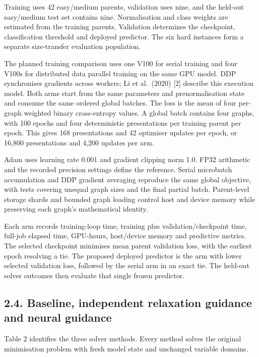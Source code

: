 \documentclass[
  british,
  10pt,
]{article}
\begin{document}
Training uses 42 easy/medium parents, validation uses nine, and the
held-out easy/medium test set contains nine. Normalisation and class
weights are estimated from the training parents. Validation determines
the checkpoint, classification threshold and deployed predictor. The six
hard instances form a separate size-transfer evaluation population.

The planned training comparison uses one V100 for serial training and
four V100s for distributed data parallel training on the same GPU model.
DDP synchronises gradients across workers; Li et al.~(2020) {[}2{]}
describe this execution model. Both arms start from the same parameters
and prenormalisation state and consume the same ordered global batches.
The loss is the mean of four per-graph weighted binary cross-entropy
values. A global batch contains four graphs, with 100 epochs and four
deterministic presentations per training parent per epoch. This gives
168 presentations and 42 optimiser updates per epoch, or 16,800
presentations and 4,200 updates per arm.

Adam uses learning rate 0.001 and gradient clipping norm 1.0. FP32
arithmetic and the recorded precision settings define the reference.
Serial microbatch accumulation and DDP gradient averaging reproduce the
same global objective, with tests covering unequal graph sizes and the
final partial batch. Parent-level storage shards and bounded graph
loading control host and device memory while preserving each graph's
mathematical identity.

Each arm records training-loop time, training plus validation/checkpoint
time, full-job elapsed time, GPU-hours, host/device memory and
predictive metrics. The selected checkpoint minimises mean parent
validation loss, with the earliest epoch resolving a tie. The proposed
deployed predictor is the arm with lower selected validation loss,
followed by the serial arm in an exact tie. The held-out solver outcomes
then evaluate that single frozen predictor.

\subsection{2.4. Baseline, independent relaxation guidance and neural
guidance}\label{baseline-independent-relaxation-guidance-and-neural-guidance}

Table 2 identifies the three solver methods. Every method solves the
original minimisation problem with fresh model state and unchanged
variable domains.
\end{document}

